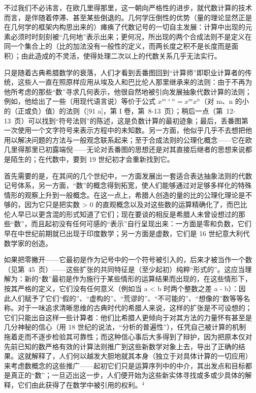 不过我们不必讳言，在欧几里得那里，这一朝向严格性的进步，就代数计算的技术而言，是伴随着停滞、甚至某些倒退的。几何学压倒性的优势（量的理论显然正是在几何学的框架内构思出来的）瘫痪了代数记号的一切自主发展：计算中出现的元素必须时时刻刻被“几何地”表示出来；更何况，所出现的两个合成法则不是定义在同一个集合上的（比的加法没有一般性的定义，而两长度之积不是长度而是面积）；由此造成的不灵活，使得处理二次以上的代数关系几乎无法实行。

只是随着古典希腊数学的衰落，人们才看到丢番图回到“计算师”即职业计算者的传统，这些人一直在照原样应用从埃及人和巴比伦人那里继承来的法则：由于不再为他所考虑的那些“数”寻求几何表示，他很自然地被引向发展抽象代数计算的法则；例如，他给出了一些（用现代语言说）等价于公式 \(x^{m+n} = x^{m}x^{n}\)（对 m、n 的小的（正或负）值）的法则（{[}91 a{]}，第 I 卷，第~8-13~页）；稍后一点（第~12-13~页）可以找到“符号法则”的陈述，这是负数计算的最初迹象；最后，丢番图第一次使用一个文字符号来表示方程中的未知数。另一方面，他似乎几乎不去想把他用以解决问题的方法与一般观念联系起来；至于合成法则的公理化概念——它在欧几里得那里已初露端倪——无论对丢番图的思想还是对其直接后继者的思想来说都是陌生的；在代数中，要到 19 世纪初才会重新找到它。

首先需要的是，在其间的几个世纪中，一方面发展出一套适合表达抽象法则的代数记号体系，另一方面，“数”的概念得到拓宽，使人们能够通过对足够多样化的特殊情形的观察上升到一般概念。在这一点上，希腊人创造的量的比的公理化理论是不够的，因为它只是把实数 \textgreater{} 0 的直观概念以及对这些数的运算精确化了，而巴比伦人早已以更含混的形式知道了它们；现在要谈的相反是希腊人未曾设想过的那些“数”，而且起初没有任何可感的“表示”自行呈现出来：一方面是零和负数，它们早在中世纪前期就已出现于印度数学；另一方面是虚数，它们是 16 世纪意大利代数学家的创造。

如果把零撇开——它最初是作为记号中的一个符号被引入的，后来才被当作一个数（见第~45~页）——这些扩张的共同特征是（至少起初）纯粹“形式的”。这应当理解为：新的“数”最初是作为施行于某些情形的运算结果而出现的，在这些情形下，按其严格的定义，它们没有任何意义（例如当 a \textless{} b 时两个整数之差 a - b）：因此人们赋予了它们“假的”、“虚构的”、“荒谬的”、“不可能的”、“想像的”数等等名称。对于一味追求清晰思维的古典时代的希腊人来说，这样的扩张是不可设想的；它们只能出自这样一些计算者：他们比希腊人更倾向于对其方法的力量怀有甚至是几分神秘的信心（用 18 世纪的说法，“分析的普遍性”），任凭自己被计算的机制拖着走而不逐步检验其可靠性；而这种信心事后大多得到了辩护，因为把原本仅对先前已知的数严格有效的计算法则推广到这些新数学对象上去，导出了正确的结果。这就解释了，人们何以越发大胆地就其本身（独立于对具体计算的一切应用）来考虑数概念的这些推广——起初它们只是运算序列中的中介，其出发点和目标都是真正的“数”；一旦迈出这一步，人们便开始为这些新实体寻找或多或少具体的解释，它们由此获得了在数学中被引用的权利。\(^{4}\)

